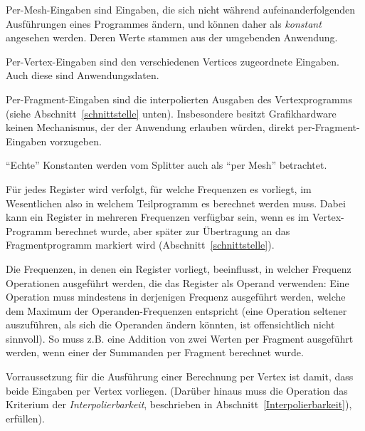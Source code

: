 \documentclass[twoside,a4paper,fleqn,12pt]{book}
\begin{document}
Per-Mesh-Eingaben sind Eingaben, die sich nicht während aufeinanderfolgenden Ausführungen eines Programmes
ändern, und können daher als \emph{konstant} angesehen werden. Deren Werte stammen aus der umgebenden Anwendung.

Per-Vertex-Eingaben sind den verschiedenen Vertices zugeordnete Eingaben. %
Auch diese sind Anwendungsdaten.

Per-Fragment-Eingaben sind die interpolierten Ausgaben des Vertexprogramms (siehe Abschnitt~\ref{schnittstelle} unten). 
Insbesondere besitzt Grafikhardware keinen Mechanismus, der der Anwendung erlauben würden, direkt per-Fragment-Eingaben
vorzugeben.

"`Echte"' Konstanten werden vom Splitter auch als "`per Mesh"' betrachtet.

Für jedes Register wird verfolgt, für welche Frequenzen es vorliegt, im Wesentlichen also in welchem Teilprogramm es berechnet werden muss.
Dabei kann ein Register in mehreren Frequenzen verfügbar sein, wenn es im Vertex-Programm berechnet wurde, aber später 
zur Übertragung an das Fragmentprogramm markiert wird (Abschnitt~\ref{schnittstelle}).


Die Frequenzen, in denen ein Register vorliegt, beeinflusst, in welcher Frequenz Operationen ausgeführt werden,
die das Register als Operand verwenden: Eine Operation muss mindestens in derjenigen Frequenz ausgeführt werden, welche dem Maximum der Operanden-Frequenzen
entspricht (eine Operation seltener auszuführen, als sich die Operanden ändern könnten, ist offensichtlich nicht sinnvoll).
So muss z.B. eine Addition von zwei Werten per Fragment ausgeführt werden, wenn einer der Summanden per Fragment berechnet wurde.

Vorraussetzung für die Ausführung einer Berechnung per Vertex ist damit, dass beide Eingaben per Vertex vorliegen.
(Darüber hinaus muss die Operation das Kriterium der \emph{Interpolierbarkeit}, beschrieben in Abschnitt~\ref{Interpolierbarkeit}), erfüllen).
\end{document}
